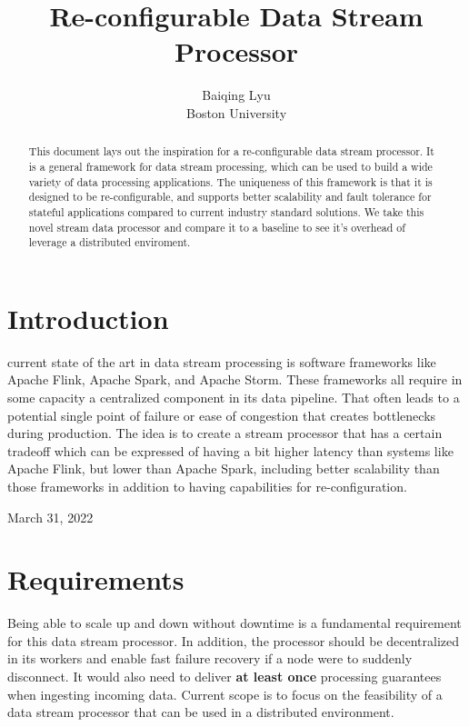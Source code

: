 \documentclass[journal]{IEEEtran}
\begin{document}
\title{Re-configurable Data Stream Processor}
\author{Baiqing Lyu \\Boston University}
\maketitle

\begin{abstract}
This document lays out the inspiration for a re-configurable data stream processor. It is a general framework for data stream processing, which can be used to build a wide variety of data processing applications. The uniqueness of this framework is that it is designed to be re-configurable, and supports better scalability and fault tolerance for stateful applications compared to current industry standard solutions. We take this novel stream data processor and compare it to a baseline to see it's overhead of leverage a distributed enviroment.
\end{abstract}

\section{Introduction}

 current state of the art in data stream processing is software frameworks like Apache Flink, Apache Spark, and Apache Storm. These frameworks all require in some capacity a centralized component in its data pipeline. That often leads to a potential single point of failure or ease of congestion that creates bottlenecks during production. The idea is to create a stream processor that has a certain tradeoff which can be expressed of having a bit higher latency than systems like Apache Flink, but lower than Apache Spark, including better scalability than those frameworks in addition to having capabilities for re-configuration.

\hfill March 31, 2022

\section{Requirements}
Being able to scale up and down without downtime is a fundamental requirement for this data stream processor. In addition, the processor should be decentralized in its workers and enable fast failure recovery if a node were to suddenly disconnect. It would also need to deliver \textbf{at least once} processing guarantees when ingesting incoming data. Current scope is to focus on the feasibility of a data stream processor that can be used in a distributed environment.
\end{document}

